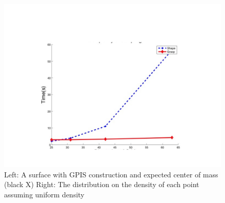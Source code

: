 \documentclass[journal,transmag]{IEEEtran}%
\begin{document}
\begin{figure}[ht!]
\centering
\includegraphics[scale = 0.3]{figures/Slide06.jpg}
\caption{ \footnotesize Left: A surface with GPIS construction and expected center of mass (black X)
Right: The distribution on the density of each point assuming uniform density}
\vspace*{-10pt}
\label{fig:GPIS_MASS}
\end{figure}
\end{document}
